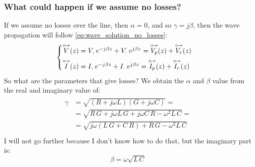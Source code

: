 \subsubsection*{What could happen if we assume no losses?}
If we assume no losses over the line, then $\alpha=0$, and so $\gamma = j\beta$, then the wave propagation will follow \cref{eq:wave_solution_no_losses}:
\begin{equation}
  \begin{cases}
  \phas{V}(z)=V\bottomPlus \,e^{-j\beta z}+V\bottomMinus \,e^{j\beta z}=\phas{V_p}(z)+\phas{V_r}(z)\\[5pt]
  \phas{I}(z)=I\bottomPlus \,e^{-j\beta z}+I\bottomMinus \,e^{j\beta z}=\phas{I_p}(z)+\phas{I_r}(z)
  \end{cases}\label{eq:wave_solution_no_losses}
\end{equation}
So what are the parameters that give losses? We obtain the $\alpha$ and $\beta$ value from the real and imaginary value of:
\begin{align}
  \begin{split}
    \gamma &=\sqrt{(R+j\omega L)(G+j\omega C)}=\\[5pt]
    &=\sqrt{R\,G+j\omega L\,G+j\omega C\,R-\omega^2L\,C}=\\[5pt]
    &=\sqrt{j\omega( L\,G + C\,R)+R\,G-\omega^2L\,C}\\[5pt]
  \end{split}
\end{align}
I will not go further because I don't know how to do that, but the imaginary part is:
\begin{equation}
  \beta=\omega\sqrt{L\,C}
\end{equation}